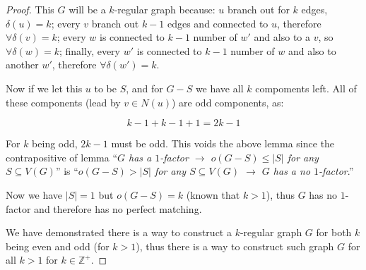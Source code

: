 \documentclass[11pt]{article}
\begin{document}
\begin{proof}
This $G$ will be a $k$-regular graph because: $u$ branch out for $k$ edges, $\delta{(u)} = k$; every $v$ branch out $k-1$ edges and connected to $u$, therefore $\forall \delta{(v)} = k$; every $w$ is connected to $k-1$ number of $w'$ and also to a $v$, so $\forall \delta{(w)} = k$; finally, every $w'$ is connected to $k-1$ number of $w$ and also to another $w'$, therefore $\forall \delta{(w')} = k$.\newline

Now if we let this $u$ to be $S$, and for $G-S$ we have all $k$ compoments left. All of these components (lead by $v \in N(u)$) are odd components, as:

\begin{equation}
    k-1 + k-1 + 1 = 2k-1
\end{equation}

For $k$ being odd, $2k-1$ must be odd. This voids the above lemma since the contrapositive of lemma ``\textit{$G$ has a $1$-factor $\longrightarrow$ $o(G-S) \leq |S|$ for any $S \subseteq V(G)$}'' is  ``\textit{$o(G-S) > |S|$ for any $S \subseteq V(G)$ $\longrightarrow$ $G$ has a no $1$-factor}.''

Now we have $|S| = 1$ but $o(G-S) = k$ (known that $k > 1$), thus $G$ has no $1$-factor and therefore has no perfect matching. \newline

We have demonstrated there is a way to construct a $k$-regular graph $G$ for both $k$ being even and odd (for $k>1$), thus there is a way to construct such graph $G$ for all $k > 1$ for $k \in \mathbb{Z}^+$.

\end{proof}

%
% 
% 
\end{document}
